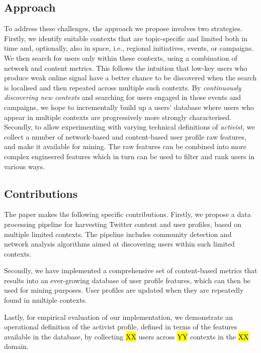 \documentclass[runningheads]{llncs}
\begin{document}
\subsection{Approach}

To address these challenges, the approach we propose involves two strategies. 
Firstly, we identify suitable contexts that are topic-specific and limited both in time and, optionally, also in space, i.e., regional initiatives, events, or campaigns.
We then search for users only within these contexts, using a combination of network and content metrics. 
This follows the intuition that low-key users who produce weak online signal have a better chance to be discovered when the search is localised and then repeated across multiple such contexts.
By \textit{continuously discovering new contexts} and searching for users engaged in those events and campaigns, we hope to incrementally build up a users' database where users who appear in multiple contexts are progressively more strongly characterised.
%
Secondly, to allow experimenting with varying technical definitions of \textit{activist}, we collect a number of network-based and content-based user profile raw features, and make it available for mining. The raw features can be combined into more complex engineered features which in turn can be used to filter and rank users in various ways.

\subsection{ Contributions}
The paper makes the following specific contributions.
%
Firstly, we propose a data processing pipeline for harvesting Twitter content and user profiles, based on multiple limited contexts. 
The pipeline includes community detection and network analysis algorithms aimed at discovering users within such limited contexts.

Secondly, we have implemented a comprehensive set of content-based metrics that results into an ever-growing database of user profile features, which can then be used for mining purposes. 
User profiles are updated when they are repeatedly found in multiple contexts.

Lastly, for empirical evaluation of our implementation, we demonstrate an operational definition of the activist profile, defined in terms of the features available in the database, by collecting \hl{XX} users across \hl{YY} contexts in the \hl{XX} domain. 
\end{document}
